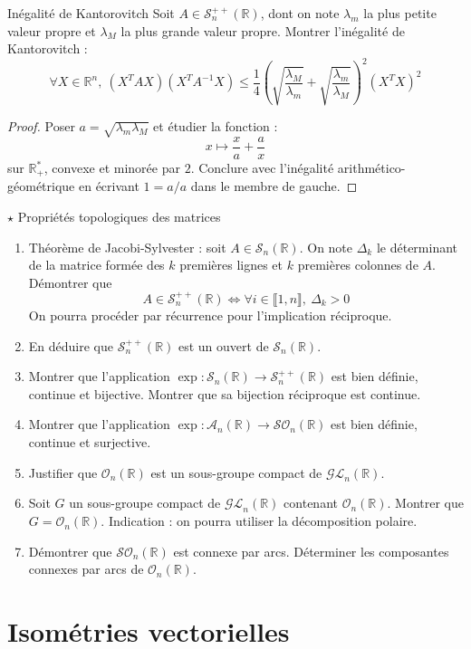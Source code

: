 \documentclass[french,a4paper]{article}
\newcommand{\R}{\mathbb{R}}
\newcommand{\st}{^*}
\newcommand{\inv}{^{-1}}
\theoremstyle{plain}
\theoremstyle{definition}
\theoremstyle{remark}
\begin{document}
\begin{ex}[X]{Inégalité de Kantorovitch}
	Soit $A\in\mathcal{S}_n^{++}(\R)$, dont on note $\lambda_m$ la plus petite valeur propre et $\lambda_M$ la plus grande valeur propre. Montrer l'inégalité de Kantorovitch : $$\forall X\in\R^n,\ (X^TAX)(X^TA\inv X)\leqslant\frac{1}{4}\left(\sqrt{\frac{\lambda_M}{\lambda_m}}+\sqrt{\frac{\lambda_m}{\lambda_M}}\right)^2(X^TX)^2$$
\end{ex}
\begin{proof}
	Poser $a=\sqrt{\lambda_m\lambda_M}$ et étudier la fonction : $$x\mapsto\frac{x}{a}+\frac{a}{x}$$ sur $\R_+\st$, convexe et minorée par $2$. Conclure avec l'inégalité arithmético-géométrique en écrivant $1=a/a$ dans le membre de gauche.
\end{proof}

\begin{ex}[Châteaux]{$\star$ Propriétés topologiques des matrices}
	\begin{enumerate}
		\item Théorème de Jacobi-Sylvester : soit $A\in\mathcal{S}_n(\R)$. On note $\Delta_k$ le déterminant de la matrice formée des $k$ premières lignes et $k$ premières colonnes de $A$. Démontrer que $$A\in\mathcal{S}_n^{++}(\R)\iff \forall i\in\llbracket1,n\rrbracket,\ \Delta_k>0$$ On pourra procéder par récurrence pour l'implication réciproque. 
		\item En déduire que $\mathcal{S}_n^{++}(\R)$ est un ouvert de $\mathcal{S}_n(\R)$.
		\item Montrer que l'application $\exp:\mathcal{S}_n(\R)\to\mathcal{S}_n^{++}(\R)$ est bien définie, continue et bijective. Montrer que sa bijection réciproque est continue.
		\item Montrer que l'application $\exp:\mathcal{A}_n(\R)\to\mathcal{SO}_n(\R)$ est bien définie, continue et surjective.
		\item Justifier que $\mathcal{O}_n(\R)$ est un sous-groupe compact de $\mathcal{GL}_n(\R)$.
		\item Soit $G$ un sous-groupe compact de $\mathcal{GL}_n(\R)$ contenant $\mathcal{O}_n(\R)$. Montrer que $G=\mathcal{O}_n(\R)$. Indication : on pourra utiliser la décomposition polaire.
		\item Démontrer que $\mathcal{SO}_n(\R)$ est connexe par arcs. Déterminer les composantes connexes par arcs de $\mathcal{O}_n(\R)$.
	\end{enumerate}
\end{ex}

\section{Isométries vectorielles}
\end{document}
